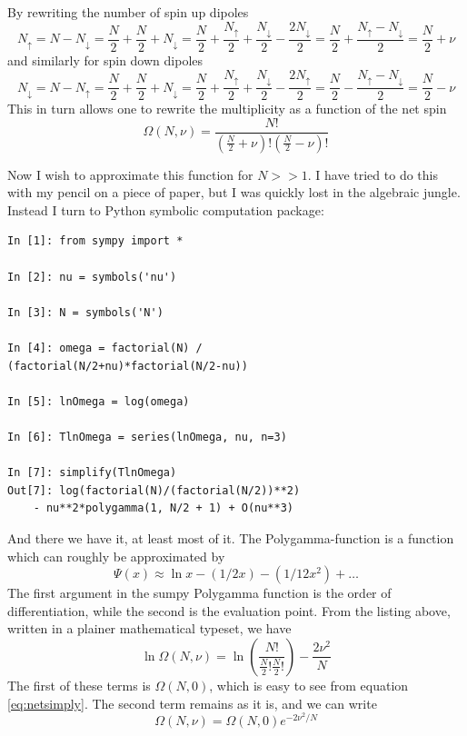 \documentclass[10pt,a4paper]{amsart}
\begin{document}
By rewriting the number of spin up dipoles
\begin{equation}
N_{\uparrow}=N-N_{\downarrow}=\frac{N}{2}+\frac{N}{2}+N_{\downarrow}
=\frac{N}{2}+\frac{N_{\uparrow}}{2}+\frac{N_{\downarrow}}{2}-\frac{2N_{\downarrow}}{2}=\frac{N}{2}+\frac{N_{\uparrow}-N_{\downarrow}}{2}=\frac{N}{2}+\nu
\end{equation}
and similarly for spin down dipoles
\begin{equation}
N_{\downarrow}=N-N_{\uparrow}=\frac{N}{2}+\frac{N}{2}+N_{\downarrow}
=\frac{N}{2}+\frac{N_{\uparrow}}{2}+\frac{N_{\downarrow}}{2}-\frac{2N_{\uparrow}}{2}=\frac{N}{2}-\frac{N_{\uparrow}-N_{\downarrow}}{2}=\frac{N}{2}-\nu
\end{equation}
This in turn allows one to rewrite the multiplicity as a function of the net spin
\begin{equation}
\label{eq:netsimply}
\Omega (N,\nu) = \frac{N!}{\left(\frac{N}{2} +\nu\right)!\left(\frac{N}{2} -\nu\right)!}
\end{equation}

Now I wish to approximate this function for $N>>1$. I have tried to do this with my pencil on a piece of paper, but I was quickly lost in the algebraic jungle. Instead I turn to Python symbolic computation package:
\begin{lstlisting}
In [1]: from sympy import *

In [2]: nu = symbols('nu')

In [3]: N = symbols('N')

In [4]: omega = factorial(N) / 
(factorial(N/2+nu)*factorial(N/2-nu))

In [5]: lnOmega = log(omega)

In [6]: TlnOmega = series(lnOmega, nu, n=3)

In [7]: simplify(TlnOmega)
Out[7]: log(factorial(N)/(factorial(N/2))**2) 
	- nu**2*polygamma(1, N/2 + 1) + O(nu**3)
\end{lstlisting}
And there we have it, at least most of it. The Polygamma-function is a function which can roughly be approximated by
\begin{equation}
\Psi(x) \approx \ln x -(1/2x) - (1/12x^2) + \dots
\end{equation}
The first argument in the sumpy Polygamma function is the order of differentiation, while the second is the evaluation point. From the listing above, written in a plainer mathematical typeset, we have
\begin{equation}
\ln \Omega(N,\nu)= \ln \left( \frac{N!}{\frac{N}{2}!\frac{N}{2}!} \right) - \frac{2\nu^2}{N}
\end{equation}
The first of these terms is $\Omega(N,0)$, which is easy to see from equation \ref{eq:netsimply}. The second term remains as it is, and we can write
\begin{equation}
\Omega(N,\nu)=\Omega(N,0)e^{-2\nu^2/N}
\end{equation}
\end{document}
